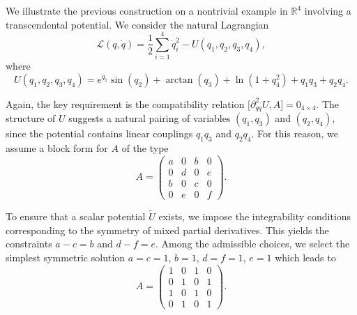 \documentclass{rendiconti}
\begin{document}
We illustrate the previous construction on a nontrivial example in $\mathbb{R}^4$ involving a transcendental potential. We consider the natural Lagrangian
\begin{equation}
\mathcal{L}(q,\dot q) = \frac12 \sum_{i=1}^4 \dot q_i^2 - U(q_1,q_2,q_3,q_4),
\end{equation}
where
\begin{equation}
U(q_1,q_2,q_3,q_4)
= e^{q_1}\sin(q_2) + \arctan(q_3) + \ln(1+q_4^2) + q_1 q_3 + q_2 q_4.
\end{equation}

Again, the key requirement is the compatibility relation
$\big[\partial^2_{qq}U,A\big]=0_{4\times4}$.
The structure of $U$ suggests a natural pairing of variables $(q_1,q_3)$ and $(q_2,q_4)$, since the potential contains linear couplings $q_1 q_3$ and $q_2 q_4$. For this reason, we assume a block form for $A$ of the type
\begin{equation}
A =
\begin{pmatrix}
a & 0 & b & 0 \\
0 & d & 0 & e \\
b & 0 & c & 0 \\
0 & e & 0 & f
\end{pmatrix}.
\end{equation}

To ensure that a scalar potential $\widetilde U$ exists, we impose the integrability conditions corresponding to the symmetry of mixed partial derivatives. This yields the constraints
$
a - c = b$ and  $d - f = e.
$
Among the admissible choices, we select the simplest symmetric solution
$a=c=1$, $b=1$, $d=f=1$, $e=1$
which leads to
\begin{equation}
A =
\begin{pmatrix}
1 & 0 & 1 & 0 \\
0 & 1 & 0 & 1 \\
1 & 0 & 1 & 0 \\
0 & 1 & 0 & 1
\end{pmatrix}.
\end{equation}
\end{document}
